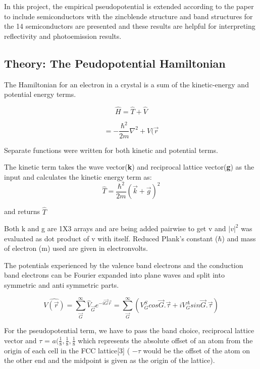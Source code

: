 \documentclass[%
 reprint,
 amsmath,amssymb,
 aps,
]{revtex4-2}
\begin{document}
In this project, the empirical pseudopotential is extended according to the paper to include semiconductors with the zincblende structure and band structures for the 14 semiconductors are presented and these results are helpful for interpreting reflectivity and photoemission results.


\subsection{\label{sec:level2}Theory: The Peudopotential Hamiltonian}
The Hamiltonian for an electron in a crystal is a sum of the kinetic-energy and potential energy terms. 

\begin{equation}
\hat{H} = \hat{T}+\hat{V}
\end{equation}

\begin{equation}
=-\frac{\hbar^2}{2m}\nabla^2 + V(\vec{r}
\end{equation}

Separate functions were written for both kinetic and potential terms.

The kinetic term takes the wave vector(\textbf{k}) and reciprocal lattice vector(\textbf{g}) as the input and calculates the kinetic energy term as: 
\begin {equation}
\hat{T} = \frac{\hbar^2}{2m}(\vec{k}+\vec{g})^2 
\end{equation}

and returns $\hat{T}$

Both k and g are 1X3 arrays and are being added pairwise to get v and $|v|^2$ was evaluated as dot product of v with itself. Reduced Plank's constant ($\hbar$) and mass of electron (m) used are given in electronvolts. 

The potentials experienced by the valence band electrons and the conduction band electrons can be Fourier expanded into plane waves and split into symmetric and anti symmetric parts. 

\begin{equation}
\hat{V(\vec{r})}= \sum_{\vec{G}}^\infty {\hat{V}_{\vec{G}}e^{-i\vec{G}\vec{r}}}
                = \sum_{\vec{G}}^\infty {(V_G^S cos{\vec{G}}.\vec{\tau}+ i V_G^A sin \vec{G}.\vec{\tau})}
\end{equation}

 For the pseudopotential term, we have to pass the band choice, reciprocal lattice vector and $\tau$ = $a(\frac{1}{8},\frac{1}{8},\frac{1}{8}$ which represents the absolute offset of an atom from the origin of each cell in the FCC lattice[3] ( $-\tau$ would be the offset of the atom on the other end and the midpoint is given as the origin of the lattice).
\end{document}
